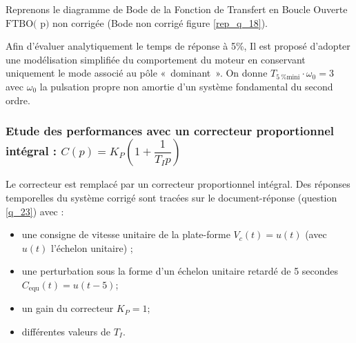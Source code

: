 Reprenons le diagramme de Bode de la Fonction de Transfert en Boucle Ouverte $\text{FTBO( p)}$ non corrigée (Bode non corrigé figure \ref{rep_q_18}).

\ifprof
\begin{corrige}

\end{corrige}
\else
\fi


Afin d’évaluer analytiquement le temps de réponse à 5\%, Il est proposé d’adopter une modélisation simplifiée du
comportement du moteur en conservant uniquement le mode associé au pôle «~dominant~». On donne $T_{\SI{5}{\%} \text{mini}}\cdot \omega_0 = 3$ avec $\omega_0$ la pulsation propre non amortie d’un système fondamental du second ordre.

\ifprof
\begin{corrige}
\end{corrige}
\else
\fi



\subsubsection{Etude des performances avec un correcteur proportionnel intégral : $C(p)={K_P}\left(1+\dfrac{1}{T_I p}\right)$}

Le correcteur est remplacé par un correcteur proportionnel intégral. Des réponses temporelles du système corrigé sont tracées sur le document-réponse (question \ref{q_23}) avec :
\begin{itemize}
\item une consigne de vitesse unitaire de la plate-forme $V_c (t)= u(t)$ (avec $u(t)$ l’échelon unitaire) ;
\item une perturbation sous la forme d’un échelon unitaire retardé de 5 secondes $C_{\text{equ}} (t) = u(t - 5)$;
\item un gain du correcteur $K_P = 1$;
\item différentes valeurs de $T_I$.
\end{itemize}

